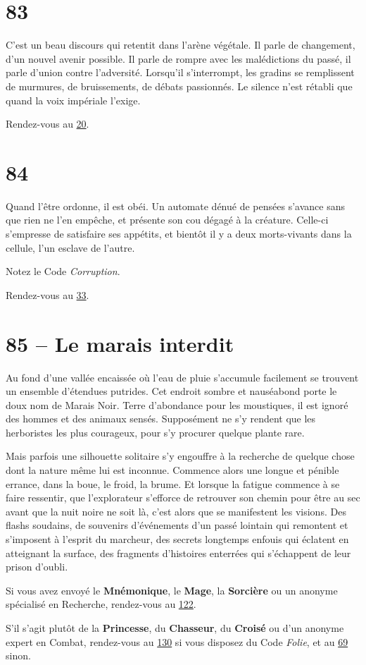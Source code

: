 \documentclass{report}
\newcommand{\gsection}[1]{
    \section{#1}
    \label{section-#1}
}
\newcommand{\glink}[1]{\hyperref[section-#1]{#1}}
\newcommand{\hero}[1]{\textbf{#1}}
\begin{document}
\gsection{83}

C'est un beau discours qui retentit dans l'arène végétale. Il parle de changement, d'un nouvel avenir possible. Il parle de rompre avec les malédictions du passé, il parle d'union contre l'adversité. Lorsqu'il s'interrompt, les gradins se remplissent de murmures, de bruissements, de débats passionnés. Le silence n'est rétabli que quand la voix impériale l'exige.

Rendez-vous au \glink{20}.

\gsection{84}

Quand l'être ordonne, il est obéi. Un automate dénué de pensées s'avance sans que rien ne l'en empêche, et présente son cou dégagé à la créature. Celle-ci s'empresse de satisfaire ses appétits, et bientôt il y a deux morts-vivants dans la cellule, l'un esclave de l'autre.

Notez le Code \emph{Corruption}.

Rendez-vous au \glink{33}.

\gsection{85 – Le marais interdit}

Au fond d'une vallée encaissée où l'eau de pluie s'accumule facilement se trouvent un ensemble d'étendues putrides. Cet endroit sombre et nauséabond porte le doux nom de Marais Noir. Terre d'abondance pour les moustiques, il est ignoré des hommes et des animaux sensés. Supposément ne s'y rendent que les herboristes les plus courageux, pour s'y procurer quelque plante rare.

Mais parfois une silhouette solitaire s'y engouffre à la recherche de quelque chose dont la nature même lui est inconnue. Commence alors une longue et pénible errance, dans la boue, le froid, la brume. Et lorsque la fatigue commence à se faire ressentir, que l'explorateur s'efforce de retrouver son chemin pour être au sec avant que la nuit noire ne soit là, c'est alors que se manifestent les visions. Des flashs soudains, de souvenirs d'événements d'un passé lointain qui remontent et s'imposent à l'esprit du marcheur, des secrets longtemps enfouis qui éclatent en atteignant la surface, des fragments d'histoires enterrées qui s'échappent de leur prison d'oubli.

Si vous avez envoyé le \hero{Mnémonique}, le \hero{Mage}, la \hero{Sorcière} ou un anonyme spécialisé en Recherche, rendez-vous au \glink{122}.

S'il s'agit plutôt de la \hero{Princesse}, du \hero{Chasseur}, du \hero{Croisé} ou d'un anonyme expert en Combat, rendez-vous au \glink{130} si vous disposez du Code \emph{Folie}, et au \glink{69} sinon.
\end{document}
